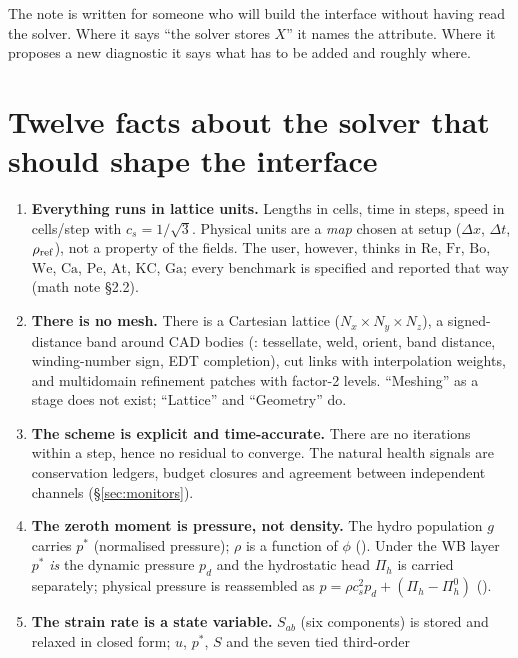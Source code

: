 \documentclass[11pt,a4paper]{article}
\renewcommand{\Re}{\mathrm{Re}}
\newcommand{\Fr}{\mathrm{Fr}}
\newcommand{\Bo}{\mathrm{Bo}}
\newcommand{\We}{\mathrm{We}}
\newcommand{\Ca}{\mathrm{Ca}}
\newcommand{\Pe}{\mathrm{Pe}}
\newcommand{\At}{\mathrm{At}}
\newcommand{\KC}{\mathrm{KC}}
\newcommand{\Ga}{\mathrm{Ga}}
\newcommand{\cs}{c_s}
\newcommand{\ps}{p^\ast}
\newcommand{\pd}{p_d}
\newcommand{\Pih}{\Pi_h}
\begin{document}
The note is written for someone who will build the interface without having read
the solver. Where it says ``the solver stores $X$'' it names the attribute. Where it
proposes a new diagnostic it says what has to be added and roughly where.

\section{Twelve facts about the solver that should shape the interface}\label{sec:facts}
\begin{enumerate}[leftmargin=2em]
\item \textbf{Everything runs in lattice units.} Lengths in cells, time in steps,
  speed in cells/step with $\cs = 1/\sqrt3$. Physical units are a \emph{map} chosen at
  setup ($\Delta x$, $\Delta t$, $\rho_{\rm ref}$), not a property of the fields. The
  user, however, thinks in $\Re$, $\Fr$, $\Bo$, $\We$, $\Ca$, $\Pe$, $\At$, $\KC$,
  $\Ga$; every benchmark is specified and reported that way (math note \S2.2).
\item \textbf{There is no mesh.} There is a Cartesian lattice ($N_x\times N_y\times N_z$),
  a signed-distance band around CAD bodies (: tessellate, weld,
  orient, band distance, winding-number sign, EDT completion), cut links with
  interpolation weights, and multidomain refinement patches with factor-2 levels.
  ``Meshing'' as a stage does not exist; ``Lattice'' and ``Geometry'' do.
\item \textbf{The scheme is explicit and time-accurate.} There are no iterations
  within a step, hence no residual to converge. The natural health signals are
  conservation ledgers, budget closures and agreement between independent channels
  (\S\ref{sec:monitors}).
\item \textbf{The zeroth moment is pressure, not density.} The hydro population $g$
  carries $\ps$ (normalised pressure); $\rho$ is a function of $\phi$
  (). Under the WB layer $\ps$ \emph{is} the dynamic
  pressure $\pd$ and the hydrostatic head $\Pih$ is carried separately; physical
  pressure is reassembled as $p = \rho\cs^2\pd + (\Pih-\Pih^0)$
  ().
\item \textbf{The strain rate is a state variable.} $S_{ab}$ (six components) is
  stored and relaxed in closed form; $u$, $\ps$, $S$ and the seven tied third-order

\end{enumerate}
\end{document}
